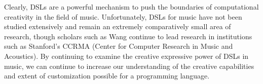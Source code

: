\documentclass{report}
\begin{document}
Clearly, DSLs are a powerful mechanism to push the boundaries of  computational creativity in the field of music. Unfortunately, DSLs for music have not been studied extensively  and  remain an extremely comparatively small area of research, though scholars such as  Wang continue to lead  research in institutions such as Stanford's CCRMA (Center for Computer Research in Music and Acoustics). By continuing to examine the creative expressive power of DSLs  in  music, we can continue to increase our understanding of the creative capabilities and extent of customization possible for  a programming language.



\end{document}
